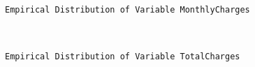 \documentclass[8pt,onecolumn,aps,pra]{revtex4-1}
\begin{document}
    \begin{Verbatim}[commandchars=\\\{\}]
Empirical Distribution of Variable MonthlyCharges

    \end{Verbatim}

    \begin{center}
    \end{center}
    { \hspace*{\fill} \\}
    
    \begin{Verbatim}[commandchars=\\\{\}]
Empirical Distribution of Variable TotalCharges

    \end{Verbatim}

    \begin{center}
    \end{center}
    { \hspace*{\fill} \\}
    
\end{document}
